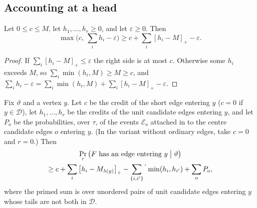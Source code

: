 \documentclass[11pt,colorlinks]{charlie}
\newcommand{\cD}{\mathcal{D}}
\newcommand{\pos}[1]{\left[#1\right]_+}
\begin{document}
\subsection{Accounting at a head}
\begin{lemma}\label{lem:maxsum}
Let $0\le c\le M$, let $h_1,\dots,h_r\ge0$, and let $\varepsilon\ge0$. Then
\[
 \max\Big(c,\ \sum_ih_i-\varepsilon\Big)\ge c+\sum_{i}\pos{h_i-M}-\varepsilon .
\]
\end{lemma}
\begin{proof}
If $\sum_i\pos{h_i-M}\le\varepsilon$ the right side is at most $c$. Otherwise some $h_i$ exceeds $M$, so $\sum_i\min(h_i,M)\ge M\ge c$, and $\sum_ih_i-\varepsilon=\sum_i\min(h_i,M)+\sum_i\pos{h_i-M}-\varepsilon$.
\end{proof}

\begin{lemma}\label{lem:head}
Fix $\vartheta$ and a vertex $y$. Let $c$ be the credit of the short edge entering $y$ ($c=0$ if $y\in\cD$), let $h_1,\dots,h_r$ be the credits of the unit candidate edges entering $y$, and let $P_o$ be the probabilities, over $\tau$, of the events $\mathcal E_o$ attached in  to the centre candidate edges $o$ entering $y$. (In the variant without ordinary edges, take $c=0$ and $r=0$.) Then
\begin{multline*}
 \Pr_\tau\big(F\text{ has an edge entering }y\bigm|\vartheta\big)\\
 \ge c+\sum_i\pos{h_i-M_{\lambda(y)}}-\sum_{\{i,i'\}}{}^{'}\min(h_i,h_{i'})+\sum_{o}P_o,
\end{multline*}
where the primed sum is over unordered pairs of unit candidate edges entering $y$ whose tails are not both in $\cD$.
\end{lemma}
\end{document}

